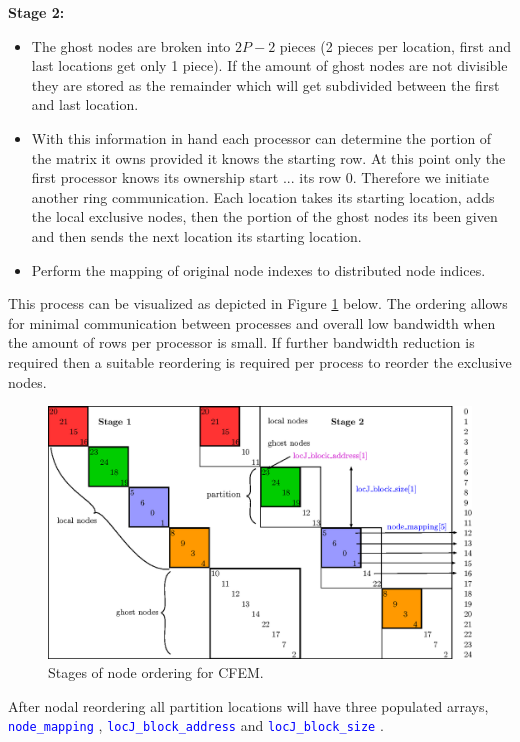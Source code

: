 \documentclass[11pt,letterpaper,titlepage]{article}
\newcommand{\xmltag}[1]{\textcolor{blue}{ \texttt{#1}} }
\numberwithin{equation}{section}
\begin{document}
\textbf{Stage 2:}
\begin{itemize}
\item The ghost nodes are broken into $2P-2$ pieces (2 pieces per location, first and last locations get only 1 piece). If the amount of ghost nodes are not divisible they are stored as the remainder which will get subdivided between the first and last location.
\item With this information in hand each processor can determine the portion of the matrix it owns provided it knows the starting row. At this point only the first processor knows its ownership start ... its row 0. Therefore we initiate another ring communication. Each location takes its starting location, adds the local exclusive nodes, then the portion of the ghost nodes its been given and then sends the next location its starting location.
\item Perform the mapping of original node indexes to distributed node indices.
\end{itemize}

This process can be visualized as depicted in Figure \ref{fig:CFEMReordering} below. The ordering allows for minimal communication between processes and overall low bandwidth when the amount of rows per processor is small. If further bandwidth reduction is required then a suitable reordering is required per process to reorder the exclusive nodes.

\begin{figure}[H]
\centering
\includegraphics[width=0.95\linewidth]{Figures/DiscretizationBaseBlockCFEMStages.eps}
\caption{Stages of node ordering for CFEM.}
\label{fig:CFEMReordering}
\end{figure}

\noindent
After nodal reordering all partition locations will have three populated arrays, \xmltag{node\_mapping}, \xmltag{locJ\_block\_address} and \xmltag{locJ\_block\_size}. 
\end{document}
